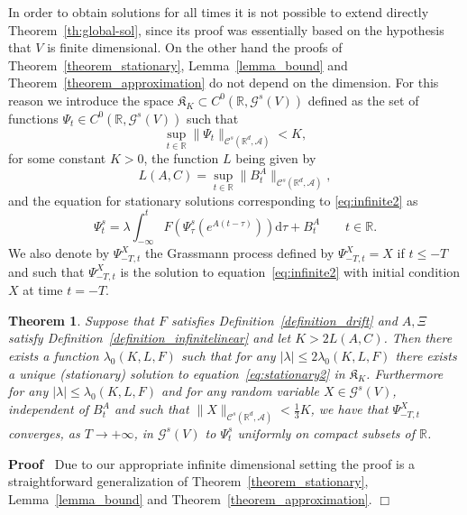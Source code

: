 \documentclass{article}
\newcommand{\mathd}{\mathrm{d}}
\newenvironment{proof}{\noindent\textbf{Proof\ }}{\hspace*{\fill}$\Box$\medskip}
\newtheorem{theorem}{Theorem}
\begin{document}
In order to obtain solutions for all times it is not possible to extend
directly Theorem~\ref{th:global-sol}, since its proof was essentially based on
the hypothesis that $V$ is finite dimensional. On the other hand the proofs of
Theorem~\ref{theorem_stationary}, Lemma~\ref{lemma_bound} and
Theorem~\ref{theorem_approximation} do not depend on the dimension. For this
reason we introduce the space $\mathfrak{K}_K \subset C^0 (\mathbb{R},
\mathcal{G}^s (V))$ defined as the set of functions $\Psi_t \in C^0
(\mathbb{R}, \mathcal{G}^s (V))$ such that
\[ \sup_{t \in \mathbb{R}} \| \Psi_t \|_{\mathcal{C}^s (\mathbb{R}^d,
   \mathcal{A})} < K, \]
for some constant $K > 0$, the function $L$ being given by
\[ L (A, C) = \sup_{t \in \mathbb{R}} \| B^A_t \|_{\mathcal{C}^s
   (\mathbb{R}^d, \mathcal{A})}, \]
and the equation for stationary solutions corresponding to
{\eqref{eq:infinite2}} as
\begin{equation}
  \Psi_t^s = \lambda \int_{- \infty}^t F (\Psi_{\tau}^s (e^{A (t - \tau)}))
  \mathd \tau + B^A_t \label{eq:stationary2} \qquad t \in \mathbb{R}.
\end{equation}
We also denote by $\Psi_{- T, t}^X$ the Grassmann process defined by $\Psi_{-
T, t}^X = X$ if $t \leqslant - T$ and such that $\Psi_{- T, t}^X$ is the
solution to equation~{\eqref{eq:infinite2}} with initial condition $X$ at time
$t = - T$. \

\begin{theorem}
  \label{theorem_longtime2}Suppose that $F$ satisfies
  Definition~\ref{definition_drift} and $A, \Xi$ satisfy
  Definition~\ref{definition_infinitelinear} and let $K > 2 L (A, C)$. Then
  there exists a function $\lambda_0 (K, L, F)$ such that for any $| \lambda |
  \leqslant 2 \lambda_0 (K, L, F)$ there exists a unique (stationary) solution
  to equation~{\eqref{eq:stationary2}} in $\mathfrak{K}_K$. Furthermore for
  any $| \lambda | \leqslant \lambda_0 (K, L, F)$ and for any random variable
  $X \in \mathcal{G}^s_{\mathcal{}} (V)$, independent of $B^A_t$ and such that
  $\| X \|_{\mathcal{C}^s (\mathbb{R}^d, \mathcal{A})} < \frac{1}{3} K$, we
  have that $\Psi^X_{- T, t}$ converges, as $T \rightarrow + \infty$, in
  $\mathcal{G}^s (V)$ to $\Psi^s_t$ uniformly on compact subsets of
  $\mathbb{R}$.
\end{theorem}

\begin{proof}
  Due to our appropriate infinite dimensional setting the proof is a
  straightforward generalization of Theorem~\ref{theorem_stationary},
  Lemma~\ref{lemma_bound} and Theorem~\ref{theorem_approximation}.
\end{proof}
\end{document}
